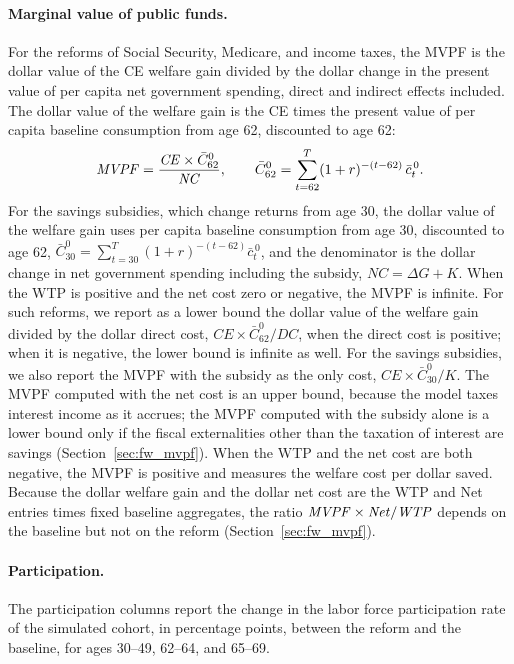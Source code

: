 \paragraph{Marginal value of public funds.} For the reforms of Social Security, Medicare, and income taxes, the MVPF is the dollar value of the CE welfare gain divided by the dollar change in the present value of per capita net government spending, direct and indirect effects included. The dollar value of the welfare gain is the CE times the present value of per capita baseline consumption from age 62, discounted to age 62:
\begin{equation*}
\mathit{MVPF}=\frac{\mathit{CE}\times\bar C^{0}_{62}}{\mathit{NC}},\qquad \bar C^{0}_{62}=\sum_{t=62}^{T}(1+r)^{-(t-62)}\,\bar c^{\,0}_{t}.
\end{equation*}
For the savings subsidies, which change returns from age 30, the dollar value of the welfare gain uses per capita baseline consumption from age 30, discounted to age 62, $\bar C^{0}_{30}=\sum_{t=30}^{T}(1+r)^{-(t-62)}\bar c^{\,0}_t$, and the denominator is the dollar change in net government spending including the subsidy, $\mathit{NC}=\Delta G+K$. When the WTP is positive and the net cost zero or negative, the MVPF is infinite. For such reforms, we report as a lower bound the dollar value of the welfare gain divided by the dollar direct cost, $\mathit{CE}\times\bar C^{0}_{62}/\mathit{DC}$, when the direct cost is positive; when it is negative, the lower bound is infinite as well. For the savings subsidies, we also report the MVPF with the subsidy as the only cost, $\mathit{CE}\times\bar C^{0}_{30}/K$. The MVPF computed with the net cost is an upper bound, because the model taxes interest income as it accrues; the MVPF computed with the subsidy alone is a lower bound only if the fiscal externalities other than the taxation of interest are savings (Section~\ref{sec:fw_mvpf}). When the WTP and the net cost are both negative, the MVPF is positive and measures the welfare cost per dollar saved. Because the dollar welfare gain and the dollar net cost are the WTP and Net entries times fixed baseline aggregates, the ratio $\mathit{MVPF}\times\mathit{Net}/\mathit{WTP}$ depends on the baseline but not on the reform (Section~\ref{sec:fw_mvpf}).

\paragraph{Participation.} The participation columns report the change in the labor force participation rate of the simulated cohort, in percentage points, between the reform and the baseline, for ages 30--49, 62--64, and 65--69.
